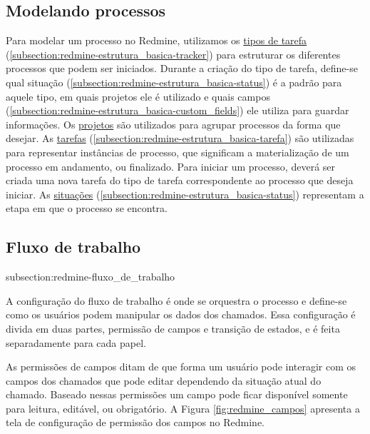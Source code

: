 \subsection{Modelando processos}\label{subsection:redmine-automatizar_processo-criacao}

Para modelar um processo no Redmine, utilizamos os \underline{tipos de tarefa} (\ref{subsection:redmine-estrutura_basica-tracker}) para estruturar os diferentes processos que podem ser iniciados. Durante a criação do tipo de tarefa, define-se qual situação (\ref{subsection:redmine-estrutura_basica-status}) é a padrão para aquele tipo, em quais projetos ele é utilizado e quais campos (\ref{subsection:redmine-estrutura_basica-custom_fields}) ele utiliza para guardar informações. Os \underline{projetos} são utilizados para agrupar processos da forma que desejar. As \underline{tarefas} (\ref{subsection:redmine-estrutura_basica-tarefa}) são utilizadas para representar instâncias de processo, que significam a materialização de um processo em andamento, ou finalizado. Para iniciar um processo, deverá ser criada uma nova tarefa do tipo de tarefa correspondente ao processo que deseja iniciar. As \underline{situações} (\ref{subsection:redmine-estrutura_basica-status}) representam a etapa em que o processo se encontra. 

\subsection{Fluxo de trabalho}{subsection:redmine-fluxo_de_trabalho}

A configuração do fluxo de trabalho é onde se orquestra o processo e define-se como os usuários podem manipular os dados dos chamados. Essa configuração é divida em duas partes, permissão de campos e transição de estados, e é feita separadamente para cada papel.

As permissões de campos ditam de que forma um usuário pode interagir com os campos dos chamados que pode editar dependendo da situação atual do chamado. Baseado nessas permissões um campo pode ficar disponível somente para leitura, editável, ou obrigatório. A Figura \ref{fig:redmine_campos} apresenta a tela de configuração de permissão dos campos no Redmine.

